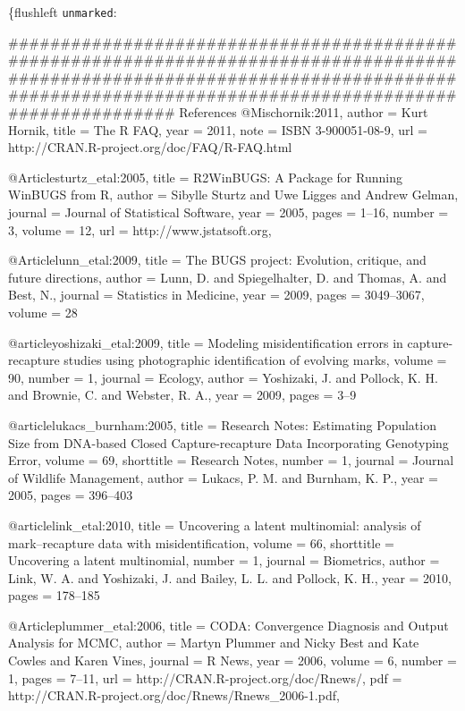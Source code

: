 {{{{{{\{flushleft {{\tt unmarked}: }


############################################################################################################################################################################################
References
@Misc{hornik:2011,
       author        = {Kurt Hornik},
       title         = {The {R} {FAQ}},
       year          = {2011},
       note          = {{ISBN} 3-900051-08-9},
       url           = {http://CRAN.R-project.org/doc/FAQ/R-FAQ.html}
     }
     

  @Article{sturtz_etal:2005,
    title = {R2WinBUGS: A Package for Running WinBUGS from R},
    author = {Sibylle Sturtz and Uwe Ligges and Andrew Gelman},
    journal = {Journal of Statistical Software},
    year = {2005},
    pages = {1--16},
    number = {3},
    volume = {12},
    url = {http://www.jstatsoft.org},
  }

  @Article{lunn_etal:2009,
    title = {The BUGS project: Evolution, critique, and future directions},
    author = {Lunn, D. and  Spiegelhalter, D. and Thomas, A. and Best, N.},
    journal = {Statistics in Medicine},
    year = {2009},
    pages = {3049--3067},
    volume = {28}
  }
  
  @article{yoshizaki_etal:2009,
	title = {Modeling misidentification errors in capture-recapture studies using photographic identification of evolving marks},
	volume = {90},
	number = {1},
	journal = {Ecology},
	author = {Yoshizaki, J. and Pollock, K. H. and Brownie, C. and Webster, R. A.},
	year = {2009},
	pages = {3--9}
}


@article{lukacs_burnham:2005,
	title = {Research Notes: Estimating Population Size from {DNA-based} Closed Capture-recapture Data Incorporating Genotyping Error},
	volume = {69},
	shorttitle = {Research Notes},
	number = {1},
	journal = {Journal of Wildlife Management},
	author = {Lukacs, P. M. and Burnham, K. P.},
	year = {2005},
	pages = {396--403}
}

@article{link_etal:2010,
	title = {Uncovering a latent multinomial: analysis of mark–recapture data with misidentification},
	volume = {66},
	shorttitle = {Uncovering a latent multinomial},
	number = {1},
	journal = {Biometrics},
	author = {Link, W. A. and Yoshizaki, J. and Bailey, L. L. and Pollock, K. H.},
	year = {2010},
	pages = {178--185}
}

@Article{plummer_etal:2006,
    title = {CODA: Convergence Diagnosis and Output Analysis for MCMC},
    author = {Martyn Plummer and Nicky Best and Kate Cowles and Karen Vines},
    journal = {R News},
    year = {2006},
    volume = {6},
    number = {1},
    pages = {7--11},
    url = {http://CRAN.R-project.org/doc/Rnews/},
    pdf = {http://CRAN.R-project.org/doc/Rnews/Rnews_2006-1.pdf},
  }

}}}}}}
